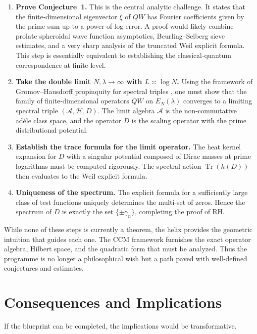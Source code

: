 \documentclass[12pt,a4paper]{article}
\begin{document}
\begin{enumerate}
\item \textbf{Prove Conjecture~1.} This is the central analytic challenge. It states that the finite‑dimensional eigenvector \(\xi\) of \(QW\) has Fourier coefficients given by the prime sum up to a power‑of‑log error. A proof would likely combine prolate spheroidal wave function asymptotics, Beurling–Selberg sieve estimates, and a very sharp analysis of the truncated Weil explicit formula. This step is essentially equivalent to establishing the classical‑quantum correspondence at finite level.

\item \textbf{Take the double limit \(N,\lambda\to\infty\) with \(L\asymp\log N\).} Using the framework of Gromov–Hausdorff propinquity for spectral triples \cite{Rieffel2004,Latremoliere2016}, one must show that the family of finite‑dimensional operators \(QW\) on \(E_N(\lambda)\) converges to a limiting spectral triple \((\mathcal{A},\mathcal{H},D)\). The limit algebra \(\mathcal{A}\) is the non‑commutative adèle class space, and the operator \(D\) is the scaling operator with the prime distributional potential.

\item \textbf{Establish the trace formula for the limit operator.} The heat kernel expansion for \(D\) with a singular potential composed of Dirac masses at prime logarithms must be computed rigorously. The spectral action \(\operatorname{Tr}(h(D))\) then evaluates to the Weil explicit formula.

\item \textbf{Uniqueness of the spectrum.} The explicit formula for a sufficiently large class of test functions uniquely determines the multi‑set of zeros. Hence the spectrum of \(D\) is exactly the set \(\{\pm\gamma_n\}\), completing the proof of RH.
\end{enumerate}

While none of these steps is currently a theorem, the helix provides the geometric intuition that guides each one. The CCM framework furnishes the exact operator algebra, Hilbert space, and the quadratic form that must be analyzed. Thus the programme is no longer a philosophical wish but a path paved with well‑defined conjectures and estimates.

\section{Consequences and Implications}
If the blueprint can be completed, the implications would be transformative.
\end{document}
